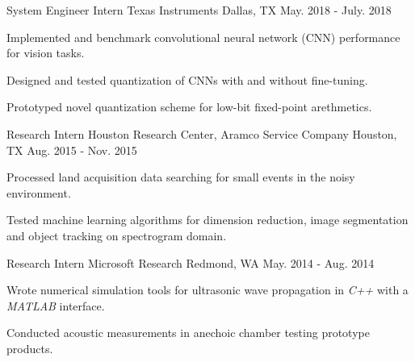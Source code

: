 \begin{cventries}
\cventry
{System Engineer Intern} %
{Texas Instruments} %
{Dallas, TX} %
{May. 2018 - July. 2018} %
{
		\begin{cvitems} %
				\item {Implemented and benchmark convolutional neural network (CNN) performance for vision tasks.}
				\item {Designed and tested quantization of CNNs with and without fine-tuning.}
				\item {Prototyped novel quantization scheme for low-bit fixed-point arethmetics.}
		\end{cvitems}
}

	\cventry
		{Research Intern} %
		{Houston Research Center, Aramco Service Company} %
		{Houston, TX} %
		{Aug. 2015 - Nov. 2015} %
		{
			\begin{cvitems} %
				\item {Processed land acquisition data searching for small events in the noisy environment.}
				\item {Tested machine learning algorithms for dimension reduction, image segmentation and object tracking on spectrogram domain.}
			\end{cvitems}
		}

	\cventry
		{Research Intern} %
		{Microsoft Research} %
		{Redmond, WA} %
		{May. 2014 - Aug. 2014} %
		{
			\begin{cvitems} %
				\item {Wrote numerical simulation tools for ultrasonic wave propagation in \textit{C++} with a \textit{MATLAB} interface.}
				\item {Conducted acoustic measurements in anechoic chamber testing prototype products.}
			\end{cvitems}
		}


\end{cventries}
